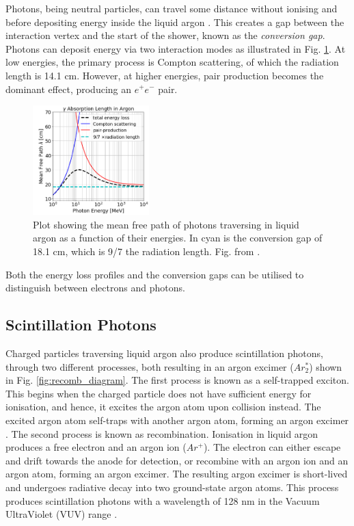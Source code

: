 Photons, being neutral particles, can travel some distance without ionising and before depositing energy inside the liquid argon \cite{uboone_gamma}.
This creates a gap between the interaction vertex and the start of the shower, known as the \textit{conversion gap}.
Photons can deposit energy via two interaction modes as illustrated in Fig. \ref{fig:uboone_gamma}.
At low energies, the primary process is Compton scattering, of which the radiation length is 14.1 cm.
However, at higher energies, pair production becomes the dominant effect, producing an $e^{+}e^{-}$ pair.
\begin{figure}[htp] 
\centering    
\includegraphics[width=0.40\textwidth]{uboone_gamma}
\caption[uboone_gamma]{
Plot showing the mean free path of photons traversing in liquid argon as a function of their energies.
In cyan is the conversion gap of 18.1 cm, which is 9/7 the radiation length.
Fig. from \cite{uboone_gamma}.
}
\label{fig:uboone_gamma}
\end{figure}
Both the energy loss profiles and the conversion gaps can be utilised to distinguish between electrons and photons. 


\subsection{Scintillation Photons}

Charged particles traversing liquid argon also produce scintillation photons, through two different processes, both resulting in an argon excimer ($Ar_{2}^{*}$) shown in Fig. \ref{fig:recomb_diagram}.
The first process is known as a self-trapped exciton.
This begins when the charged particle does not have sufficient energy for ionisation, and hence, it excites the argon atom upon collision instead.
The excited argon atom self-traps with another argon atom, forming an argon excimer .
The second process is known as recombination.
Ionisation in liquid argon produces a free electron and an argon ion ($Ar^{+}$).
The electron can either escape and drift towards the anode for detection, or recombine with an argon ion and an argon atom, forming an argon excimer.
The resulting argon excimer is short-lived and undergoes radiative decay into two ground-state argon atoms.
This process produces scintillation photons with a wavelength of 128 nm in the Vacuum UltraViolet (VUV) range \cite{Lariat}.

